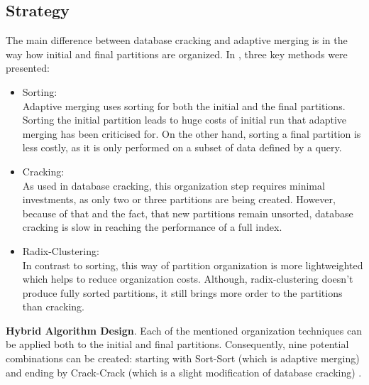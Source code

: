 \documentclass[10pt, conference, compsocconf]{IEEEtran}
\begin{document}
\subsection{Strategy}
\label{subsec:hybrid_strat}
The main difference between database cracking and adaptive merging is in the way how initial and final partitions are organized. In \cite{hybrid}, three key methods were presented:
\begin{itemize}
\item{Sorting:} \\
Adaptive merging uses sorting for both the initial and the final partitions. Sorting the initial partition leads to huge costs of initial run that adaptive merging has been criticised for. On the other hand, sorting a final partition is less costly, as it is only performed on a subset of data defined by a query.\\
\item{Cracking: } \\
As used in database cracking, this organization step requires minimal investments, as only two or three partitions are being created. However, because of that and the fact, that new partitions remain unsorted, database cracking is slow in reaching the performance of a full index.\\
\item{Radix-Clustering: } \\
In contrast to sorting, this way of partition organization is more lightweighted which helps to reduce organization costs. Although, radix-clustering doesn't produce fully sorted partitions, it still brings more order to the partitions than cracking.\\
\end{itemize}

\textbf{Hybrid Algorithm Design}. Each of the mentioned organization techniques can be applied both to the initial and final partitions. Consequently, nine potential combinations can be created: starting with Sort-Sort (which is adaptive merging) and ending by Crack-Crack (which is a slight modification of database cracking) \cite{hybrid}.
\end{document}
